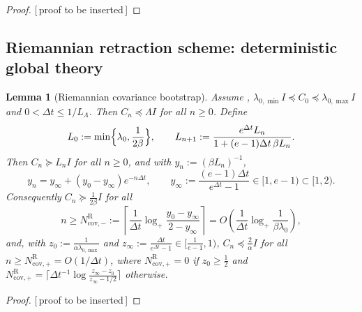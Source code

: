 \documentclass[11pt]{article}
\theoremstyle{plain}
\newtheorem{lemma}[lemma]{Lemma}
\theoremstyle{definition}
\theoremstyle{remark}
\newcommand{\Id}{I}
\newcommand{\Riem}{\mathrm{R}}
\newcommand{\logp}{\log_+}
\newcommand{\cov}{\mathrm{cov}}
\newcommand{\LB}{L_\Lambda}
\newcommand{\PROOFHOLE}{{\color{red}\textsf{[\,proof to be inserted\,]}}}
\begin{document}
\begin{proof}
\PROOFHOLE
\end{proof}

\subsection{Riemannian retraction scheme: deterministic global theory}
\label{sec:Riem-global}

\begin{lemma}[Riemannian covariance bootstrap]
\label{lem:Riem-cov}
Assume , $\lambda_{0,\min}\Id\preceq C_0\preceq\lambda_{0,\max}\Id$
and $0<\Delta t\leq1/\LB$. Then $C_n\preceq\Lambda\Id$ for all $n\geq0$. Define
\begin{equation}
\label{eq:Riem-envelope}
    L_0:=\min\Bigl\{\lambda_0,\frac1{2\beta}\Bigr\},
    \qquad
    L_{n+1}:=\frac{e^{\Delta t}L_n}{1+(e-1)\Delta t\,\beta L_n}.
\end{equation}
Then $C_n\succeq L_n\Id$ for all $n\geq0$, and with $y_n:=(\beta L_n)^{-1}$,
\begin{equation}
\label{eq:Riem-y}
    y_n=y_\infty+(y_0-y_\infty)e^{-n\Delta t},
    \qquad
    y_\infty:=\frac{(e-1)\Delta t}{e^{\Delta t}-1}\in[1,e-1)\subset[1,2).
\end{equation}
Consequently $C_n\succeq\tfrac1{2\beta}\Id$ for all
\begin{equation}
\label{eq:Ncov-minus}
    n\geq N_{\cov,-}^{\Riem}
    :=\left\lceil\frac1{\Delta t}\logp\frac{y_0-y_\infty}{2-y_\infty}\right\rceil
    =O\!\left(\frac1{\Delta t}\logp\frac1{\beta\lambda_0}\right),
\end{equation}
and, with $z_0:=\tfrac1{\alpha\lambda_{0,\max}}$ and $z_\infty:=\tfrac{\Delta t}{e^{\Delta t}-1}\in[\tfrac1{e-1},1)$,
$C_n\preceq\tfrac2\alpha\Id$ for all $n\geq N_{\cov,+}^{\Riem}=O(1/\Delta t)$, where
$N_{\cov,+}^{\Riem}=0$ if $z_0\geq\tfrac12$ and
$N_{\cov,+}^{\Riem}=\lceil\Delta t^{-1}\log\tfrac{z_\infty-z_0}{z_\infty-1/2}\rceil$ otherwise.
\end{lemma}

\begin{proof}
\PROOFHOLE
\end{proof}
\end{document}
